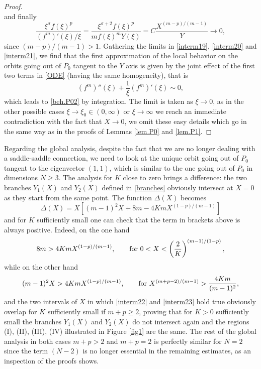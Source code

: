 \documentclass[a4paper,11pt]{article}
\numberwithin{equation}{section}
\begin{document}
\begin{proof}
\begin{equation}
\end{equation}
and finally
\begin{equation}\label{interm21}
\frac{\xi^{\sigma}f(\xi)^p}{(f^m)'(\xi)/\xi}=\frac{\xi^{\sigma+2}f(\xi)^p}{mf(\xi)^mY(\xi)}=C\frac{X^{(m-p)/(m-1)}}{Y}\to0,
\end{equation}
since $(m-p)/(m-1)>1$. Gathering the limits in \eqref{interm19}, \eqref{interm20} and \eqref{interm21}, we find that the first approximation of the local behavior on the orbits going out of $P_0$ tangent to the $Y$ axis is given by the joint effect of the first two terms in \eqref{ODE} (having the same homogeneity), that is
$$
(f^m)''(\xi)+\frac{1}{\xi}(f^m)'(\xi)\sim0,
$$
which leads to \eqref{beh.P02} by integration. The limit is taken as $\xi\to0$, as in the other possible cases $\xi\to\xi_0\in(0,\infty)$ or $\xi\to\infty$ we reach an immediate contradiction with the fact that $X\to0$, we omit these easy details which go in the same way as in the proofs of Lemmas \ref{lem.P0} and \ref{lem.P1}.
\end{proof}
Regarding the global analysis, despite the fact that we are no longer dealing with a saddle-saddle connection, we need to look at the unique orbit going out of $P_0$ tangent to the eigenvector $(1,1)$, which is similar to the one going out of $P_0$ in dimensions $N\geq3$. The analysis for $K$ close to zero brings a difference: the two branches $Y_1(X)$ and $Y_2(X)$ defined in \eqref{branches} obviously intersect at $X=0$ as they start from the same point. The function $\Delta(X)$ becomes
$$
\Delta(X)=X\left[(m-1)^2X+8m-4KmX^{(1-p)/(m-1)}\right]
$$
and for $K$ sufficiently small one can check that the term in brackets above is always positive. Indeed, on the one hand
\begin{equation}\label{interm22}
8m>4KmX^{(1-p)/(m-1)}, \qquad {\rm for} \ 0<X<\left(\frac{2}{K}\right)^{(m-1)/(1-p)},
\end{equation}
while on the other hand
\begin{equation}\label{interm23}
(m-1)^2X>4KmX^{(1-p)/(m-1)}, \qquad {\rm for} \ X^{(m+p-2)/(m-1)}>\frac{4Km}{(m-1)^2},
\end{equation}
and the two intervals of $X$ in which \eqref{interm22} and \eqref{interm23} hold true obviously overlap for $K$ sufficiently small if $m+p\geq2$, proving that for $K>0$ sufficiently small the branches $Y_1(X)$ and $Y_2(X)$ do not intersect again and the regions (I), (II), (III), (IV) illustrated in Figure \ref{fig1} are the same. The rest of the global analysis in both cases $m+p>2$ and $m+p=2$ is perfectly similar for $N=2$ since the term $(N-2)$ is no longer essential in the remaining estimates, as an inspection of the proofs shows.
\end{document}
